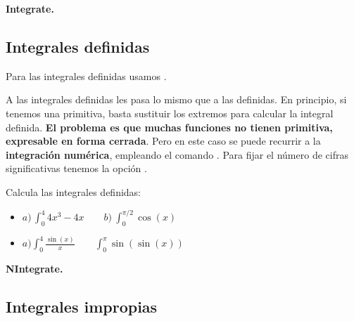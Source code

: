 \documentclass[a4paper,10pt, draft]{article}
\newcommand{\com}[1]{\textbf{\color{blue}{#1}}}
\newenvironment{ejer}{\begin{tcolorbox}[center title, title=Ejercicios,
fonttitle=\sffamily\bfseries,colback=blue!5,colframe=orange]}{\end{tcolorbox}}
\newenvironment{funciones}{\begin{tcolorbox}[center title, title=Nuevas funciones, fonttitle=\sffamily\bfseries, colback=green!5!white,colframe=red!75!black]}{\end{tcolorbox}\bigskip}
\begin{document}
\begin{funciones}

\textbf{Integrate.}

\end{funciones}




\newpage

\subsection{Integrales definidas}

Para las integrales definidas usamos \com{Integrate[f,\{$x,a,b$\}]}.

A las integrales definidas les pasa lo mismo que a las definidas. En principio, si tenemos una primitiva, basta sustituir los extremos para calcular la integral definida. \textbf{El problema es que muchas funciones no tienen primitiva, expresable en forma cerrada}. Pero en este caso se puede recurrir a la \textbf{integración numérica}, empleando el  comando \com{NIntegrate[f,\{$x,a,b$\}]}.
Para fijar el número de cifras significativas tenemos la opción \com{WorkingPrecision}.



\begin{ejer}

Calcula las integrales definidas:

\begin{itemize}

\item $\displaystyle a)\, \int_0^4 4x^3-4x \qquad b)\ \int_0^{\pi/2} \cos(x)$

\item $\displaystyle a) \int_0^4 \frac{\sin(x)}{x} \qquad \int_0^\pi \sin(\sin(x))$

\end{itemize}

\end{ejer}

\begin{funciones}

\textbf{NIntegrate.}


\end{funciones}



  \newpage

\subsection{Integrales impropias}
\end{document}
